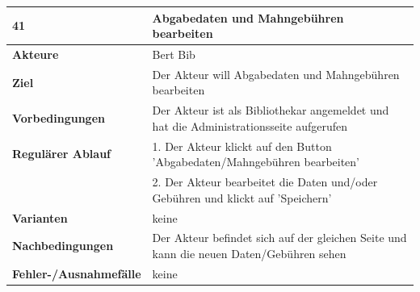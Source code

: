\documentclass[fontsize=12pt,paper=a4,twoside]{scrartcl}
\begin{document}
\newpage
\begin{table}[htbp]
\label{41}
\begin{tabular}{|l|p{10cm}|}
\hline 
\textbf{41} & \textbf{Abgabedaten und Mahngebühren bearbeiten} \\ \hline
\textbf{Akteure} & Bert Bib\\ \hline
\textbf{Ziel} & Der Akteur will Abgabedaten und Mahngebühren bearbeiten \\ \hline
\textbf{Vorbedingungen} & Der Akteur ist als Bibliothekar angemeldet und hat die Administrationsseite 
aufgerufen \\ \hline
\textbf{Regulärer Ablauf} & 
1. Der Akteur klickt auf den Button 'Abgabedaten/Mahngebühren bearbeiten' \\
&2. Der Akteur bearbeitet die Daten und/oder Gebühren und klickt auf 'Speichern'\\
\hline
\textbf{Varianten} & 
keine \\ \hline
\textbf{Nachbedingungen} & Der Akteur befindet sich auf der gleichen Seite und kann die neuen 
Daten/Gebühren sehen\\ \hline
\textbf{Fehler-/Ausnahmefälle} & keine\\
\hline
\end{tabular}
\end{table}

\newpage
\end{document}
